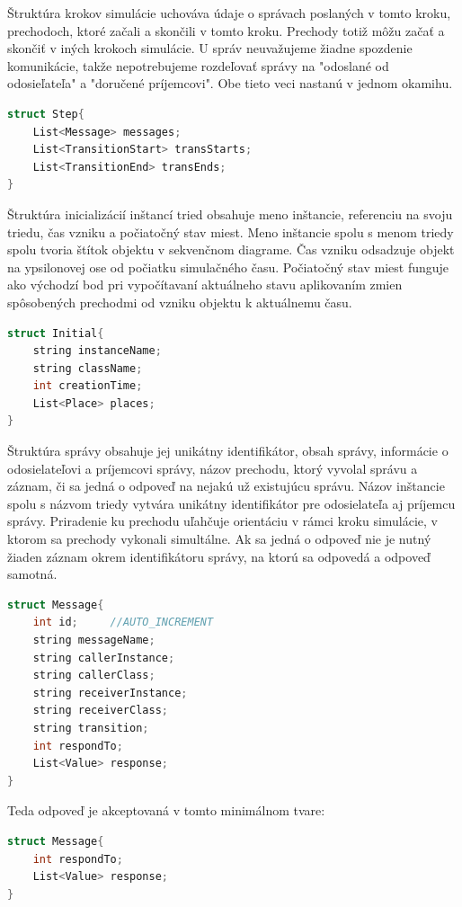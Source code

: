 Štruktúra krokov simulácie uchováva údaje o správach poslaných v tomto kroku, prechodoch, ktoré začali a skončili v tomto kroku. Prechody totiž môžu začať a skončiť v iných krokoch simulácie. U správ neuvažujeme žiadne spozdenie komunikácie, takže nepotrebujeme rozdeľovať správy na "odoslané od odosieľateľa" a "doručené príjemcovi". Obe tieto veci nastanú v jednom okamihu.

\begin{lstlisting}[language=C++]
struct Step{
	List<Message> messages;
	List<TransitionStart> transStarts;
	List<TransitionEnd> transEnds;
}
\end{lstlisting}

Štruktúra inicializácií inštancí tried obsahuje meno inštancie, referenciu na svoju triedu, čas vzniku a počiatočný stav miest.
Meno inštancie spolu s menom triedy spolu tvoria štítok objektu v sekvenčnom diagrame. Čas vzniku odsadzuje objekt na ypsilonovej ose od počiatku simulačného času. Počiatočný stav miest funguje ako východzí bod pri vypočítavaní aktuálneho stavu aplikovaním zmien spôsobených prechodmi od vzniku objektu k aktuálnemu času.

\begin{lstlisting}[language=C++]
struct Initial{
	string instanceName;
	string className;
	int creationTime;
	List<Place> places;
}
\end{lstlisting}

Štruktúra správy obsahuje jej unikátny identifikátor, obsah správy, informácie o odosielateľovi a príjemcovi správy, názov prechodu, ktorý vyvolal správu a záznam, či sa jedná o odpoveď na nejakú už existujúcu správu. Názov inštancie spolu s názvom triedy vytvára unikátny identifikátor pre odosielateľa aj príjemcu správy. Priradenie ku prechodu uľahčuje orientáciu v rámci kroku simulácie, v ktorom sa prechody vykonali simultálne.
Ak sa jedná o odpoveď nie je nutný žiaden záznam okrem identifikátoru správy, na ktorú sa odpovedá a odpoveď samotná.
\begin{lstlisting}[language=C++]
struct Message{
	int id;		//AUTO_INCREMENT
	string messageName;
	string callerInstance;
	string callerClass;
	string receiverInstance;
	string receiverClass;
	string transition;
	int respondTo;
	List<Value> response;
}
\end{lstlisting}

Teda odpoveď je akceptovaná v tomto minimálnom tvare:

\begin{lstlisting}[language=C++]
struct Message{
	int respondTo;
	List<Value> response;
}
\end{lstlisting}

